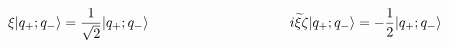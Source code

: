 \begin{equation}
\label{pm}
\xi|q_+;q_- \rangle=\frac{1}{\sqrt{2}}|q_+;q_- \rangle
\hspace{1.4in}
i{\widetilde \xi}\zeta|q_+;q_- \rangle=-\frac{1}{2}|q_+;q_- 
\rangle
\end{equation}

